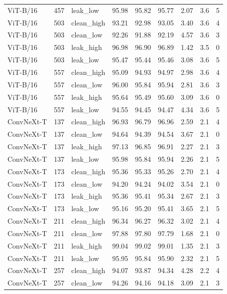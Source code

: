 {\begin{longtable}{lrlrrrrrr}
ViT-B/16 & 457 & leak\_low & 95.98 & 95.82 & 95.77 & 2.07 & 3.6 & 5 \\
ViT-B/16 & 503 & clean\_high & 93.21 & 92.98 & 93.05 & 3.40 & 3.6 & 4 \\
ViT-B/16 & 503 & clean\_low & 92.26 & 91.88 & 92.19 & 4.57 & 3.6 & 3 \\
ViT-B/16 & 503 & leak\_high & 96.98 & 96.90 & 96.89 & 1.42 & 3.5 & 0 \\
ViT-B/16 & 503 & leak\_low & 95.47 & 95.44 & 95.46 & 3.08 & 3.6 & 5 \\
ViT-B/16 & 557 & clean\_high & 95.09 & 94.93 & 94.97 & 2.98 & 3.6 & 4 \\
ViT-B/16 & 557 & clean\_low & 96.00 & 95.84 & 95.94 & 2.81 & 3.6 & 3 \\
ViT-B/16 & 557 & leak\_high & 95.64 & 95.49 & 95.60 & 3.09 & 3.6 & 0 \\
ViT-B/16 & 557 & leak\_low & 94.55 & 94.45 & 94.47 & 4.34 & 3.6 & 5 \\
ConvNeXt-T & 137 & clean\_high & 96.93 & 96.79 & 96.96 & 2.59 & 2.1 & 4 \\
ConvNeXt-T & 137 & clean\_low & 94.64 & 94.39 & 94.54 & 3.67 & 2.1 & 0 \\
ConvNeXt-T & 137 & leak\_high & 97.13 & 96.85 & 96.91 & 2.27 & 2.1 & 3 \\
ConvNeXt-T & 137 & leak\_low & 95.98 & 95.84 & 95.94 & 2.26 & 2.1 & 5 \\
ConvNeXt-T & 173 & clean\_high & 95.36 & 95.33 & 95.26 & 2.70 & 2.1 & 4 \\
ConvNeXt-T & 173 & clean\_low & 94.20 & 94.24 & 94.02 & 3.54 & 2.1 & 0 \\
ConvNeXt-T & 173 & leak\_high & 95.36 & 95.41 & 95.34 & 2.67 & 2.1 & 3 \\
ConvNeXt-T & 173 & leak\_low & 95.16 & 95.20 & 95.41 & 3.65 & 2.1 & 5 \\
ConvNeXt-T & 211 & clean\_high & 96.34 & 96.27 & 96.32 & 3.02 & 2.1 & 4 \\
ConvNeXt-T & 211 & clean\_low & 97.88 & 97.80 & 97.79 & 1.68 & 2.1 & 0 \\
ConvNeXt-T & 211 & leak\_high & 99.04 & 99.02 & 99.01 & 1.35 & 2.1 & 3 \\
ConvNeXt-T & 211 & leak\_low & 95.95 & 95.84 & 95.90 & 2.32 & 2.1 & 5 \\
ConvNeXt-T & 257 & clean\_high & 94.07 & 93.87 & 94.34 & 4.28 & 2.2 & 4 \\
ConvNeXt-T & 257 & clean\_low & 94.26 & 94.16 & 94.18 & 3.09 & 2.1 & 3 \\

\end{longtable}}

